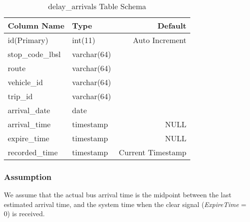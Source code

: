 \begin{table}
\centering
\begin{tabular}{@{}llr@{}} \toprule
Column Name & Type & Default \\ \midrule
id(Primary) & int(11) & Auto Increment \\
stop\_code\_lbsl & varchar(64) &  \\
route & varchar(64) &  \\
vehicle\_id & varchar(64) & \\
trip\_id & varchar(64) & \\
arrival\_date & date &  \\
arrival\_time & timestamp & NULL \\
expire\_time & timestamp & NULL \\
recorded\_time & timestamp & Current Timestamp \\ \bottomrule
\end{tabular}
\caption{delay\_arrivals Table Schema}
\label{table:delay_arrivals_schema}
\end{table}

\subsubsection{Assumption}
We assume that the actual bus arrival time is the midpoint between the last estimated arrival time, and the system time when the clear signal (\textit{ExpireTime} = 0) is received.